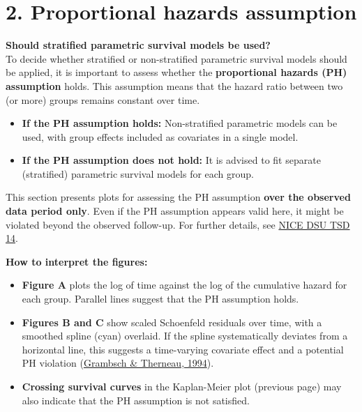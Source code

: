 \documentclass[
]{article}
\providecommand{\tightlist}{%
  \setlength{\itemsep}{0pt}\setlength{\parskip}{0pt}}
\begin{document}
\clearpage

\section{2. Proportional hazards
assumption}\label{proportional-hazards-assumption}

\textbf{Should stratified parametric survival models be used?}\\
To decide whether stratified or non-stratified parametric survival
models should be applied, it is important to assess whether the
\textbf{proportional hazards (PH) assumption} holds. This assumption
means that the hazard ratio between two (or more) groups remains
constant over time.

\begin{itemize}
\tightlist
\item
  \textbf{If the PH assumption holds:} Non-stratified parametric models
  can be used, with group effects included as covariates in a single
  model.\\
\item
  \textbf{If the PH assumption does not hold:} It is advised to fit
  separate (stratified) parametric survival models for each group.
\end{itemize}

This section presents plots for assessing the PH assumption \textbf{over
the observed data period only}. Even if the PH assumption appears valid
here, it might be violated beyond the observed follow-up. For further
details, see
\href{http://nicedsu.org.uk/wp-content/uploads/2016/03/NICE-DSU-TSD-Survival-analysis.updated-March-2013.v2.pdf}{NICE
DSU TSD 14}.

\textbf{How to interpret the figures:}

\begin{itemize}
\tightlist
\item
  \textbf{Figure A} plots the log of time against the log of the
  cumulative hazard for each group. Parallel lines suggest that the PH
  assumption holds.\\
\item
  \textbf{Figures B and C} show scaled Schoenfeld residuals over time,
  with a smoothed spline (cyan) overlaid. If the spline systematically
  deviates from a horizontal line, this suggests a time-varying
  covariate effect and a potential PH violation
  (\href{https://doi.org/10.1093/biomet/81.3.515}{Grambsch \& Therneau,
  1994}).\\
\item
  \textbf{Crossing survival curves} in the Kaplan-Meier plot (previous
  page) may also indicate that the PH assumption is not satisfied.
\end{itemize}
\end{document}
